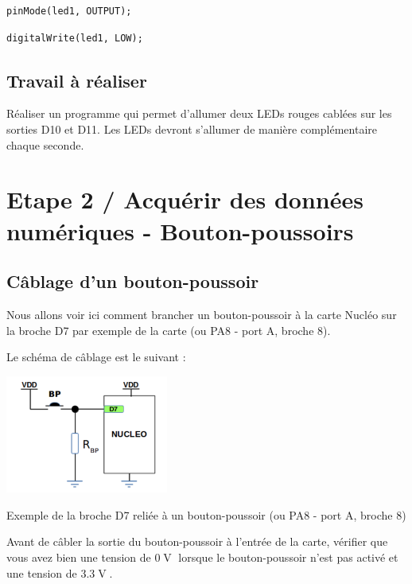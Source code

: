 \documentclass[a4paper,11pt,titlepage]{article} %
\begin{document}
\begin{lstlisting}
pinMode(led1, OUTPUT);
\end{lstlisting}

\begin{lstlisting}
digitalWrite(led1, LOW);
\end{lstlisting}


\subsection{Travail à réaliser}

\Manip Réaliser un programme qui permet d'allumer deux LEDs rouges cablées sur les sorties D10 et D11. Les LEDs devront s'allumer de manière complémentaire chaque seconde.

\newpage
\section{Etape 2 / Acquérir des données numériques - Bouton-poussoirs}


\subsection{Câblage d'un bouton-poussoir}

Nous allons voir ici comment brancher un bouton-poussoir à la carte Nucléo sur la broche D7 par exemple de la carte (ou PA8 - port A, broche 8).

Le schéma de câblage est le suivant :

\begin{center}
	\includegraphics[width=0.4\textwidth]{images/MINE_Nucleo_BoutonPoussoir.png}
	
	Exemple de la broche D7 reliée à un bouton-poussoir (ou PA8 - port A, broche 8)
\end{center}

Avant de câbler la sortie du bouton-poussoir à l'entrée de la carte, vérifier que vous avez bien une tension de $0\operatorname{V}$ lorsque le bouton-poussoir n'est pas activé et une tension de $3.3\operatorname{V}$.
\end{document}
